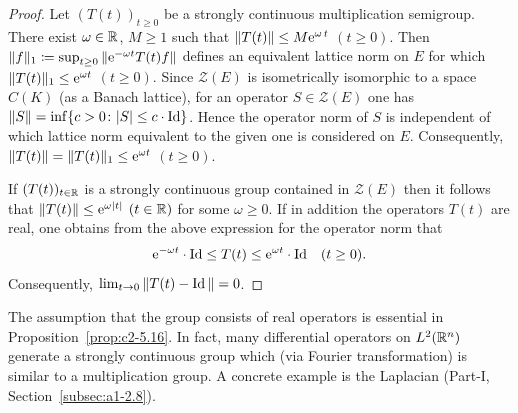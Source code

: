 \begin{proof}
Let $(T(t))_{t \geq 0}$ be a strongly continuous multiplication semigroup.
There exist $\omega \in \mathbb{R}$, $M \geq 1$ such that $\|T(t)\| \leq M\eu^{\omega\,t}$ $(t \geq 0)$.
Then 
$\|f\|_1 \coloneq \sup_{t \geq 0}\|\eu^{-\omega t}T(t)f\|$ 
defines an equivalent lattice norm on $E$ for which 
$\|T(t)\|_1 \leq \eu^{\omega t}$ $(t \geq 0)$.
Since $\mathcal{Z}(E)$ is isometrically isomorphic to a space $C(K)$ (as a Banach lattice), for an operator $S \in \mathcal{Z}(E)$ one has $\|S\| = \inf\{c > 0 \colon |S| \leq c \cdot \Id\}$.
Hence the operator norm of\/ $S$ is independent of which lattice norm equivalent to the given one is considered on $E$.
Consequently, $\|T(t)\| = \|T(t)\|_1 \leq \eu^{\omega t}$ $(t \geq 0)$.

If\/ $(T(t))_{t \in \mathbb{R}}$ is a strongly continuous group contained in $\mathcal{Z}(E)$ then it follows that $\|T(t)\| \leq \eu^{\omega|t|}$ $(t \in \mathbb{R})$ for some $\omega \geq 0$. 
If in addition the operators $T(t)$ are real, one obtains from the above expression for the operator norm that 
\[
\eu^{- \omega t} \cdot \Id \leq T(t) \leq \eu^{\omega t} \cdot \Id \quad (t \geq 0).
\] 
Consequently, $\lim_{t \to 0}\|T(t) - \operatorname{Id}\| = 0$.
\end{proof}
The assumption that the group consists of real operators is essential in Proposition~\ref{prop:c2-5.16}.
In fact, many differential operators on $L^{2}(\mathbb{R}^n)$ generate a strongly continuous group which (via Fourier transformation) is similar to a multiplication group.
A concrete example is the Laplacian (Part-I, Section~\ref{subsec:a1-2.8}).

